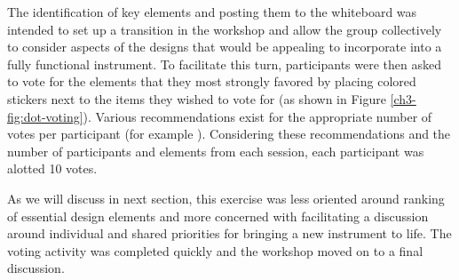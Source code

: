 \documentclass[letterpaper, 12pt]{article}
\begin{document}
The identification of key elements and posting them to the whiteboard was intended to set up a transition in the workshop and allow the group collectively to consider aspects of the designs that would be appealing to incorporate into a fully functional instrument. To facilitate this turn, participants were then asked to vote for the elements that they most strongly favored by placing colored stickers next to the items they wished to vote for (as shown in Figure \ref{ch3-fig:dot-voting}). 
Various recommendations exist for the appropriate number of votes per participant (for example \citep{Gray2010, Gibbons2019}). Considering these recommendations and the number of participants and elements from each session, each participant was alotted 10 votes.

As we will discuss in next section, this exercise was less oriented around ranking of essential design elements and more concerned with facilitating a discussion around individual and shared priorities for bringing a new instrument to life. The voting activity was completed quickly and the workshop moved on to a final discussion.
\end{document}
